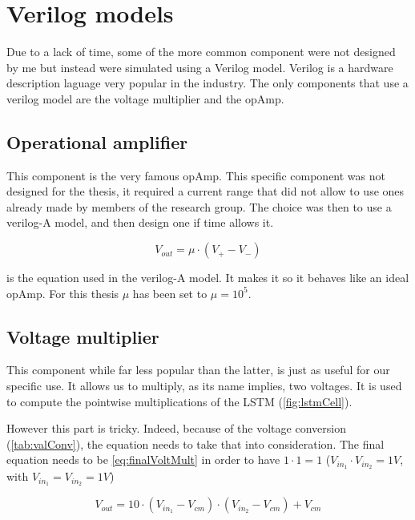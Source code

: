 \section{Verilog models}
\label{sec:models}

Due to a lack of time, some of the more common component were not designed by me but instead were simulated using a Verilog model. Verilog is a hardware description laguage very popular in the industry. The only components that use a verilog model are the voltage multiplier and the \ac{opAmp}.

\subsection{Operational amplifier}\label{subsec:opamp}

This component is the very famous \ac{opAmp}. This specific component was not designed for the thesis, it required a current range that did not allow to use ones already made by members of the research group. The choice was then to use a verilog-A model, and then design one if time allows it.

\begin{equation}
  \label{eq:opAmp}
  V_{out}=\mu \cdot (V_+-V_-)
\end{equation}

 is the equation used in the verilog-A model. It makes it so it behaves like an ideal \ac{opAmp}. For this thesis $\mu$ has been set to $\mu=10^5$.

\subsection{Voltage multiplier}\label{subsec:voltmult}

This component while far less popular than the latter, is just as useful for our specific use. It allows us to multiply, as its name implies, two voltages. It is used to compute the pointwise multiplications of the \ac{LSTM} (\cref{fig:lstmCell}).

However this part is tricky. Indeed, because of the voltage conversion (\cref{tab:valConv}), the equation needs to take that into consideration. The final equation needs to be \cref{eq:finalVoltMult} in order to have $1\cdot 1=1$ ($V_{in_1}\cdot V_{in_2}=1V$, with $V_{in_1}=V_{in_2}=1V$)

\begin{equation}\label{eq:finalVoltMult}
  V_{out}=10\cdot(V_{in_1}-V_{cm})\cdot (V_{in_2}-V_{cm}) + V_{cm}
\end{equation}

